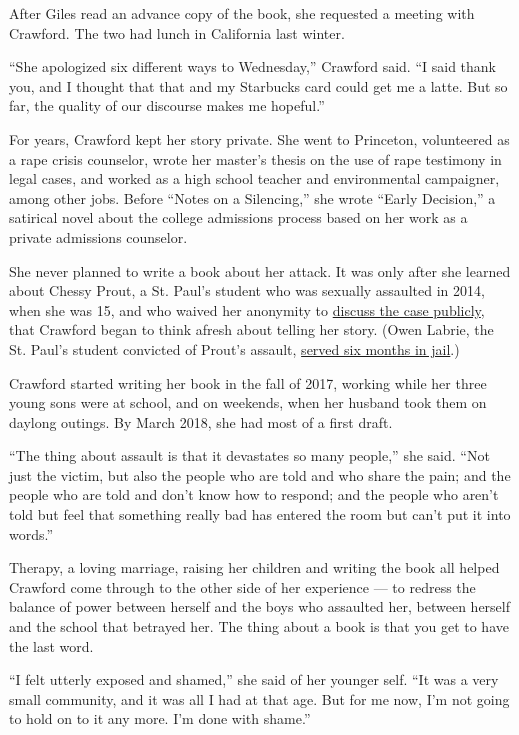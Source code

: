 After Giles read an advance copy of the book, she requested a meeting
with Crawford. The two had lunch in California last winter.

``She apologized six different ways to Wednesday,'' Crawford said. ``I
said thank you, and I thought that that and my Starbucks card could get
me a latte. But so far, the quality of our discourse makes me hopeful.''

For years, Crawford kept her story private. She went to Princeton,
volunteered as a rape crisis counselor, wrote her master's thesis on the
use of rape testimony in legal cases, and worked as a high school
teacher and environmental campaigner, among other jobs. Before ``Notes
on a Silencing,'' she wrote ``Early Decision,'' a satirical novel about
the college admissions process based on her work as a private admissions
counselor.

She never planned to write a book about her attack. It was only after
she learned about Chessy Prout, a St. Paul's student who was sexually
assaulted in 2014, when she was 15, and who waived her anonymity to
\href{https://www.nytimes.com/2016/08/31/us/chessy-prout-sexual-assault-victim-of-owen-labrie-at-new-hampshire-school-speaks-out.html}{discuss
the case publicly}, that Crawford began to think afresh about telling
her story. (Owen Labrie, the St. Paul's student convicted of Prout's
assault,
\href{https://www.nytimes.com/2019/07/05/us/rich-privilege-courts.html}{served
six months in jail}.)

Crawford started writing her book in the fall of 2017, working while her
three young sons were at school, and on weekends, when her husband took
them on daylong outings. By March 2018, she had most of a first draft.

``The thing about assault is that it devastates so many people,'' she
said. ``Not just the victim, but also the people who are told and who
share the pain; and the people who are told and don't know how to
respond; and the people who aren't told but feel that something really
bad has entered the room but can't put it into words.''

Therapy, a loving marriage, raising her children and writing the book
all helped Crawford come through to the other side of her experience ---
to redress the balance of power between herself and the boys who
assaulted her, between herself and the school that betrayed her. The
thing about a book is that you get to have the last word.

``I felt utterly exposed and shamed,'' she said of her younger self.
``It was a very small community, and it was all I had at that age. But
for me now, I'm not going to hold on to it any more. I'm done with
shame.''

